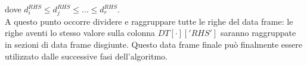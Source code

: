 dove $d^{RHS}_i \leq d^{RHS}_j \leq \ldots \leq d^{RHS}_r$. \\
A questo punto occorre dividere e raggruppare tutte le righe del data frame: le righe aventi lo stesso valore sulla colonna $DT[\cdot]['RHS']$ saranno raggruppate in sezioni di data frame disgiunte. 
Questo data frame finale può finalmente essere utilizzato dalle successive fasi dell'algoritmo.